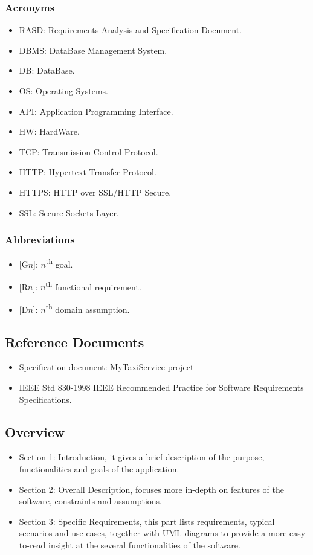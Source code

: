 \documentclass[a4paper,11pt]{report} %
\begin{document}
	\subsubsection{Acronyms}
	\begin{itemize}
		\item RASD: Requirements Analysis and Specification Document.
		\item DBMS: DataBase Management System.
		\item DB: DataBase.
		\item OS: Operating Systems.
		\item API: Application Programming Interface.
		\item HW: HardWare.
		\item TCP: Transmission Control Protocol.
		\item HTTP: Hypertext Transfer Protocol.
		\item HTTPS: HTTP over SSL/HTTP Secure.
		\item SSL: Secure Sockets Layer.
		
	\end{itemize}
	
		\subsubsection{Abbreviations}
		\begin{itemize}
			\item {[}G$n${]}: $n$\textsuperscript{th} goal.
			\item {[}R$n${]}: $n$\textsuperscript{th} functional requirement.
			\item {[}D$n${]}: $n$\textsuperscript{th} domain assumption.
		\end{itemize}
	
	\subsection{Reference Documents}
		\begin{itemize}
			\item Specification document: MyTaxiService project
			\item IEEE Std 830-1998 IEEE Recommended Practice for Software Requirements	Specifications.
		\end{itemize}
	
	\subsection{Overview}
		\begin{itemize}
			\item Section 1: Introduction, it gives a brief description of the purpose, functionalities and goals of the application.
			\item Section 2: Overall Description, focuses more in-depth on features of the software, constraints and assumptions.
			\item Section 3: Specific Requirements, this part lists requirements, typical scenarios	and use cases, together with UML diagrams to provide a more easy-to-read insight at the several functionalities of the software.
		\end{itemize}
	
\end{document}
